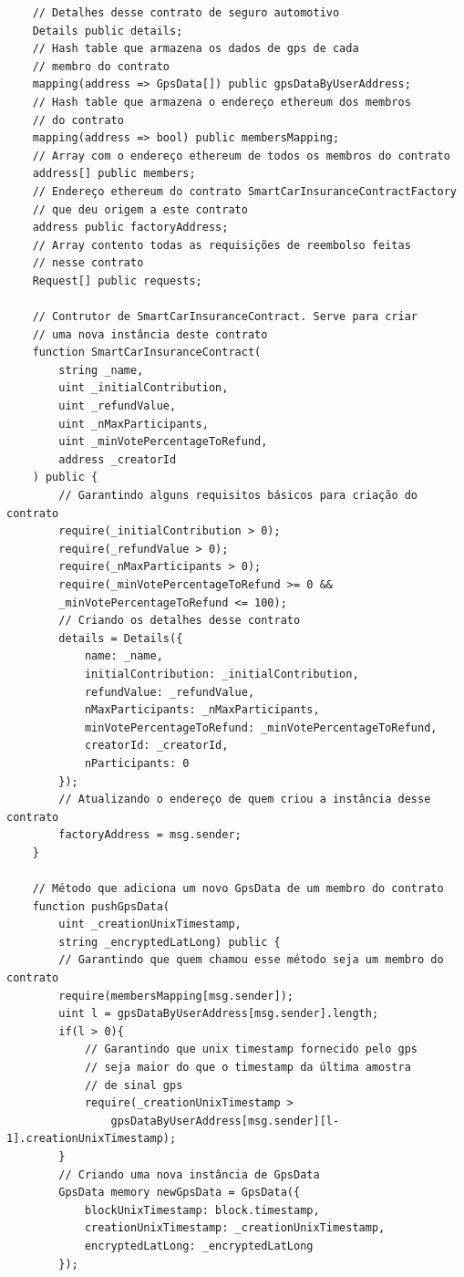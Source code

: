 \begin{code}
\begin{verbatim}
    // Detalhes desse contrato de seguro automotivo
    Details public details;
    // Hash table que armazena os dados de gps de cada
    // membro do contrato
    mapping(address => GpsData[]) public gpsDataByUserAddress;
    // Hash table que armazena o endereço ethereum dos membros
    // do contrato
    mapping(address => bool) public membersMapping;
    // Array com o endereço ethereum de todos os membros do contrato
    address[] public members;
    // Endereço ethereum do contrato SmartCarInsuranceContractFactory
    // que deu origem a este contrato
    address public factoryAddress;
    // Array contento todas as requisições de reembolso feitas
    // nesse contrato
    Request[] public requests;
    
    // Contrutor de SmartCarInsuranceContract. Serve para criar
    // uma nova instância deste contrato
    function SmartCarInsuranceContract(
        string _name,
        uint _initialContribution,
        uint _refundValue,
        uint _nMaxParticipants,
        uint _minVotePercentageToRefund,
        address _creatorId
    ) public {
        // Garantindo alguns requisitos básicos para criação do contrato
        require(_initialContribution > 0);
        require(_refundValue > 0);
        require(_nMaxParticipants > 0);
        require(_minVotePercentageToRefund >= 0 && 
        _minVotePercentageToRefund <= 100);
        // Criando os detalhes desse contrato
        details = Details({
            name: _name,
            initialContribution: _initialContribution,
            refundValue: _refundValue,
            nMaxParticipants: _nMaxParticipants,
            minVotePercentageToRefund: _minVotePercentageToRefund,
            creatorId: _creatorId,
            nParticipants: 0
        });
        // Atualizando o endereço de quem criou a instância desse contrato
        factoryAddress = msg.sender;
    }

    // Método que adiciona um novo GpsData de um membro do contrato
    function pushGpsData(
        uint _creationUnixTimestamp, 
        string _encryptedLatLong) public {
        // Garantindo que quem chamou esse método seja um membro do contrato
        require(membersMapping[msg.sender]);
        uint l = gpsDataByUserAddress[msg.sender].length;
        if(l > 0){
            // Garantindo que unix timestamp fornecido pelo gps
            // seja maior do que o timestamp da última amostra
            // de sinal gps
            require(_creationUnixTimestamp > 
                gpsDataByUserAddress[msg.sender][l-1].creationUnixTimestamp);
        }
        // Criando uma nova instância de GpsData
        GpsData memory newGpsData = GpsData({
            blockUnixTimestamp: block.timestamp,
            creationUnixTimestamp: _creationUnixTimestamp,
            encryptedLatLong: _encryptedLatLong
        });


\end{verbatim}
\end{code}

